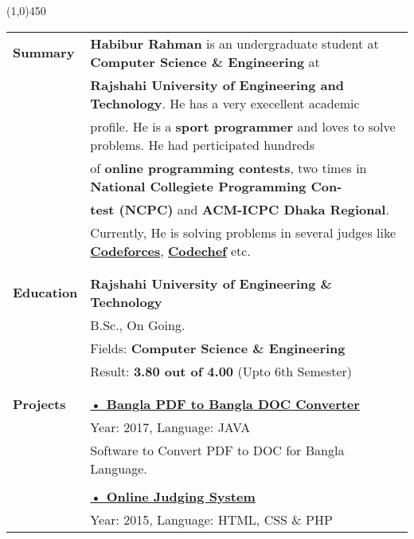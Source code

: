 \documentclass[letterpaper,11pt,oneside]{article}
\begin{document}
\vspace{-1ex}
{\line(1,0){450}}
\vspace{1ex}
\vspace{1cm}
\noindent \begin{tabular}{@{} l l}
 \Large{\textbf{Summary}}	& \textbf{Habibur Rahman} is an undergraduate student at \textbf{ Computer Science  \& Engineering}  at\\
	& \textbf{Rajshahi University of Engineering and Technology}. He has a very execellent academic\\
	&  profile. He is a \textbf{sport programmer} and loves to solve problems. He had perticipated hundreds \\
	&  of \textbf{online programming contests}, two times in \textbf{National Collegiete Programming Con-}\\
	& \textbf{test (NCPC)} and \textbf{ACM-ICPC Dhaka Regional}. \\
	& Currently, He is solving problems in several judges like \href{http://codeforces.com/profile/habib_rahman}{\textbf{Codeforces}}, \href{https://www.codechef.com/users/habib_ruet}{\textbf{Codechef}} etc. \\
 \\
 \\
 \Large{\textbf{Education}}    & \textbf{Rajshahi University of Engineering \& Technology} \\
     & B.Sc., On Going. \\
     & Fields:\textbf{ Computer Science \& Engineering} \\
     & Result: \textbf{3.80 out of 4.00} (Upto 6th Semester)\\
     \\
     \\
 \Large{\textbf{Projects}}    &  \href{https://github.com/habibrahmanbd/BanglaPDFtoBanglaDOC}{\textbf{• Bangla PDF to Bangla DOC Converter}} \\
 	& Year: 2017, Language: JAVA\\
    & \parbox{5.0in}{Software to Convert PDF to DOC for Bangla Language.}\\
    & \\
    & \href{https://github.com/habibrahmanbd/onlinelabsystem}{\textbf{• Online Judging System}}\\
    & Year: 2015, Language: HTML, CSS \& PHP \\

\end{tabular}
\end{document}

